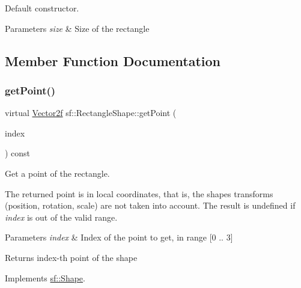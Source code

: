 Default constructor. 


\begin{DoxyParams}{Parameters}
{\em size} & Size of the rectangle \\
\hline
\end{DoxyParams}


\subsection{Member Function Documentation}
\mbox{\label{classsf_1_1_rectangle_shape_a3909f1a1946930ff5ae17c26206c0f81}} 
\subsubsection{\texorpdfstring{get\+Point()}{getPoint()}}
{\footnotesize\ttfamily virtual \hyperlink{classsf_1_1_vector2}{Vector2f} sf\+::\+Rectangle\+Shape\+::get\+Point (\begin{DoxyParamCaption}\item[{std\+::size\+\_\+t}]{index }\end{DoxyParamCaption}) const\hspace{0.3cm}{\ttfamily [virtual]}}



Get a point of the rectangle. 

The returned point is in local coordinates, that is, the shape\textquotesingle{}s transforms (position, rotation, scale) are not taken into account. The result is undefined if {\itshape index} is out of the valid range.


\begin{DoxyParams}{Parameters}
{\em index} & Index of the point to get, in range \mbox{[}0 .. 3\mbox{]}\\
\hline
\end{DoxyParams}
\begin{DoxyReturn}{Returns}
index-\/th point of the shape 
\end{DoxyReturn}


Implements \hyperlink{classsf_1_1_shape_a40e5d83713eb9f0c999944cf96458085}{sf\+::\+Shape}.

\mbox{\label{classsf_1_1_rectangle_shape_adfb2f429e5720c9ccdb26d5996c3ae33}} 
